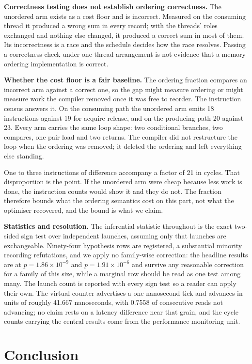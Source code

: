 \documentclass[conference]{IEEEtran}
\begin{document}
\textbf{Correctness testing does not establish ordering correctness.} The
unordered arm exists as a cost floor and is incorrect. Measured on the
consuming thread it produced a wrong sum in every record; with the threads'
roles exchanged and nothing else changed, it produced a correct sum in most of
them. Its incorrectness is a race and the schedule decides how the race
resolves. Passing a correctness check under one thread arrangement is not
evidence that a memory-ordering implementation is correct.

\textbf{Whether the cost floor is a fair baseline.}
The ordering fraction compares an incorrect arm against a correct one, so the
gap might measure ordering or might measure work the compiler removed once it
was free to reorder. The instruction census answers it. On the consuming path the unordered arm emits 18 instructions against 19
for acquire-release, and on the producing path 20 against 23. Every arm carries
the same loop shape: two conditional branches, two compares, one pair load and
two returns. The compiler did not restructure the loop when the ordering was
removed; it deleted the ordering and left everything else standing.

One to three instructions of difference accompany a factor of 21 in cycles.
That disproportion is the point. If the unordered arm were cheap because less
work is done, the instruction counts would show it and they do not. The
fraction therefore bounds what the ordering semantics cost on this part, not
what the optimiser recovered, and the bound is what we claim.


\textbf{Statistics and resolution.} The inferential statistic throughout is the
exact two-sided sign test over independent launches, assuming only that
launches are exchangeable. Ninety-four hypothesis rows are registered, a
substantial minority recording refutations, and we apply no family-wise
correction: the headline results are at $p = 1.86\times10^{-9}$ and
$p = 1.91\times10^{-6}$ and survive any reasonable correction for a family of
this size, while a marginal row should be read as one test among many. The
launch count is reported with every sign test so a reader can apply their own.
The virtual counter advertises a one nanosecond tick and advances in units of
roughly 41.667 nanoseconds, with 0.7558 of consecutive reads not advancing; no
claim rests on a latency difference near that grain, and the cycle counts
carrying the central results come from the performance monitoring unit.

\section{Conclusion}
\end{document}
